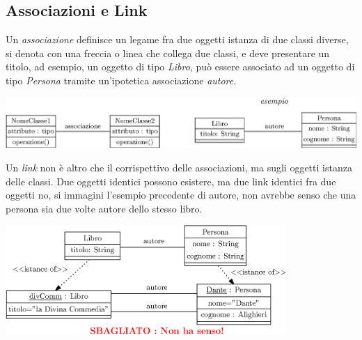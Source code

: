 \documentclass[12pt, letterpaper]{article}
\begin{document}
\subsection{Associazioni e Link}
Un \textit{associazione} definisce un legame fra due oggetti istanza di due classi diverse, si denota con una freccia o linea che collega due classi,
e deve presentare un titolo, ad esempio, un oggetto di tipo \textit{Libro}, può essere associato ad un oggetto
di tipo \textit{Persona} tramite un'ipotetica associazione \textit{autore}.\begin{center}
    \includegraphics[width=\textwidth ]{images/associazione.eps}
\end{center}
Un \textit{link} non è altro che il corrispettivo delle associazioni, ma sugli oggetti istanza delle classi. Due oggetti
identici possono esistere, ma due link identici fra due oggetti no, si immagini l'esempio precedente di autore,
non avrebbe senso che una persona sia due volte autore dello stesso libro.\begin{center}
    \includegraphics[width=0.8\textwidth ]{images/2link.eps}
\end{center}
\end{document}

